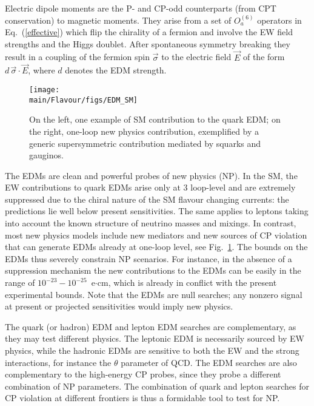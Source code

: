 
Electric dipole moments  are the P- and CP-odd  
counterparts (from CPT conservation) to magnetic moments. They arise from a set of  ${O}^{(6)}_{a}$ operators in Eq.~(\ref{effective}) which flip the chirality of a fermion  and involve the EW field strengths and the Higgs doublet. After spontaneous symmetry breaking they result in a coupling 
of the fermion spin $\vec{\sigma}$ to the electric field $\vec{E}$ of the form $d\,\vec{\sigma} \cdot \vec{E}$, where $d$  denotes the  EDM strength.

\begin{figure}
\begin{center}
\texttt{[image: \\main/Flavour/figs/EDM\_SM]} \hspace*{5mm}
\end{center}
\caption{On the left, one example of SM contribution to the quark EDM; on the right, one-loop new physics contribution, exemplified by a generic supersymmetric  contribution mediated by squarks and gauginos. }\label{fig:FeynEDM} 
\end{figure}

The EDMs are clean and powerful probes of new physics (NP).  
In the SM, the
EW contributions to quark EDMs arise only at 3 loop-level and are
extremely suppressed due to the chiral nature of the SM flavour changing currents: the predictions lie well below present sensitivities. The same applies to leptons taking into account the known structure of neutrino masses and mixings. 
In contrast, most new physics models   
include new mediators and  new sources of CP violation that can generate  EDMs already at one-loop level, see Fig.~\ref{fig:FeynEDM}. The bounds on the EDMs thus severely constrain NP scenarios. For instance, 
in the absence of a suppression mechanism the new contributions to the EDMs can be easily in 
the range of $10^{-23}- 10^{-25}$~e$\cdot$cm, which is already in conflict with the present experimental bounds. Note that the EDMs are null searches; any nonzero signal at present or projected sensitivities would imply new physics.


The quark (or hadron) EDM and lepton EDM searches are complementary, as they may test different physics.  The leptonic  EDM is necessarily sourced by EW physics, while the hadronic EDMs are sensitive to both the EW and the strong interactions, for instance the $\theta$  parameter of QCD. 
The EDM searches are also
complementary to the high-energy CP probes, since they probe a different combination of NP parameters. 
 The combination of
quark and lepton searches for CP violation at different frontiers is
thus a formidable tool to test for NP. 



